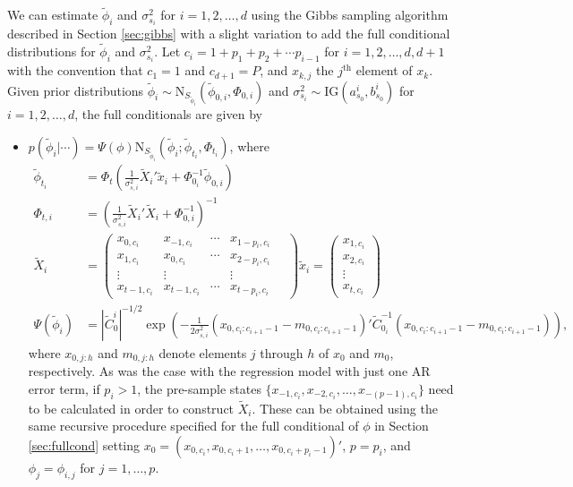 \documentclass{article}
\begin{document}
We can estimate $\tilde{\phi}_i$ and $\sigma^2_{s_i}$ for $i = 1,2,\ldots,d$ using the Gibbs sampling algorithm described in Section \ref{sec:gibbs} with a slight variation to add the full conditional distributions for $\tilde{\phi}_i$ and $\sigma^2_{s_i}$. Let $c_i = 1 + p_1 + p_2 + \cdots p_{i-1}$ for $i = 1,2,\ldots,d,d+1$ with the convention that $c_1 = 1$ and $c_{d+1} = P$, and $x_{k,j}$ the $j^{\mbox{th}}$ element of $x_k$. Given prior distributions $\tilde{\phi}_i \sim \mbox{N}_{S_{\tilde{\phi}_i}}(\tilde{\phi}_{0,i}, \Phi_{0,i})$ and $\sigma^2_{s_i} \sim \mbox{IG}(a^i_{s_0}, b^i_{s_0})$ for $i = 1,2,\ldots,d$, the full conditionals are given by
\begin{itemize}
\item $p(\tilde{\phi}_i|\cdots) = \Psi(\phi)\mbox{N}_{S_{\tilde{\phi}_i}}(\tilde{\phi}_i; \tilde{\phi}_{t_i},\Phi_{t_i})$, where
\begin{align*}
\tilde{\phi}_{t_i} &= \Phi_t\left(\frac{1}{\sigma^2_{s,i}} \tilde{X}_i'\tilde{x}_i + \Phi_{0_i}^{-1}\tilde{\phi}_{0,i}\right) \\
\Phi_{t,i} &= \left(\frac{1}{\sigma^2_{s,i}} \tilde{X}_i'\tilde{X}_i + \Phi_{0,i}^{-1}\right)^{-1} \\
\tilde{X}_i &= \left(\begin{array}{ccccc}
x_{0,c_i} & x_{-1,c_i} & \cdots & x_{1-p_i,c_i} \\
x_{1,c_i} & x_{0,c_i} & \cdots & x_{2-p_i,c_i} \\
\vdots & \vdots & & \vdots \\
x_{t-1,c_i} & x_{t-1,c_i} & \cdots & x_{t-p_i,c_i}
\end{array} \quad
\right) \tilde{x}_i = \left(\begin{array}{c} x_{1,c_i} \\ x_{2,c_i} \\ \vdots \\ x_{t,c_i} \end{array}\right) \\
\Psi(\tilde{\phi}_i) &= \left|\tilde{C}^i_0\right|^{-1/2}\exp\left(-\frac{1}{2\sigma^2_{s,i}}(x_{0,c_i:c_{i+1}-1}-m_{0,c_i:c_{i+1}-1})'\tilde{C}_{0_i}^{-1}(x_{0,c_i:c_{i+1}-1}-m_{0,c_i:c_{i+1}-1})\right),
\end{align*}
where $x_{0,j:h}$ and $m_{0,j:h}$ denote elements $j$ through $h$ of $x_0$ and $m_0$, respectively. As was the case with the regression model with just one AR error term, if $p_i > 1$, the pre-sample states $\{x_{-1,c_i}, x_{-2,c_i}, \ldots, x_{-(p-1),c_i}\}$ need to be calculated in order to construct $\tilde{X}_i$. These can be obtained using the same recursive procedure specified for the full conditional of $\phi$ in Section \ref{sec:fullcond} setting $x_0 = (x_{0,c_i},x_{0,c_i+1},\ldots,x_{0,c_i+p_i-1})'$, $p = p_i$, and $\phi_j = \phi_{i,j}$ for $j = 1,\ldots,p$. \\

\end{itemize}
\end{document}

